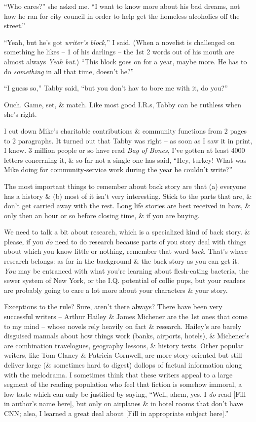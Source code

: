 \documentclass{article}
\numberwithin{equation}{section}
\begin{document}
``Who cares?'' she asked me. ``I want to know more about his bad dreams, not how he ran for city council in order to help get the homeless alcoholics off the street.''

``Yeah, but he's got \textit{writer's block},'' I said. (When a novelist is challenged on something he likes -- 1 of his darlings -- the 1st 2 words out of his mouth are almost always \textit{Yeah but}.) ``This block goes on for a year, maybe more. He has to do \textit{something} in all that time, doesn't he?''

``I guess so,'' Tabby said, ``but you don't hav to bore me with it, do you?''

Ouch. Game, set, \& match. Like most good I.R.s, Tabby can be ruthless when she's right.

I cut down Mike's charitable contributions \& community functions from 2 pages to 2 paragraphs. It turned out that Tabby was right -- as soon as I saw it in print, I knew. 3 million people or so have read \textit{Bag of Bones}, I've gotten at least 4000 letters concerning it, \& so far not a single one has said, ``Hey, turkey! What was Mike doing for community-service work during the year he couldn't write?''

The most important things to remember about back story are that (a) everyone has a history \& (b) most of it isn't very interesting. Stick to the parts that are, \& don't get carried away with the rest. Long life stories are best received in bars, \& only then an hour or so before closing time, \& if you are buying.

 We need to talk a bit about research, which is a specialized kind of back story. \& please, if you \textit{do} need to do research because parts of you story deal with things about which you know little or nothing, remember that word \textit{back}. That's where research belongs: as far in the background \& the back story as you can get it. \textit{You} may be entranced with what you're learning about flesh-eating bacteria, the sewer system of New York, or the I.Q. potential of collie pups, but your readers are probably going to care a lot more about your characters \& your story.

Exceptions to the rule? Sure, aren't there always? There have been very successful writers -- Arthur Hailey \& James Michener are the 1st ones that come to my mind -- whose novels rely heavily on fact \& research. Hailey's are barely disguised manuals about how things work (banks, airports, hotels), \& Michener's are combination travelogues, geography lessons, \& history texts. Other popular writers, like Tom Clancy \& Patricia Cornwell, are more story-oriented but still deliver large (\& sometimes hard to digest) dollops of factual information along with the melodrama. I sometimes think that these writers appeal to a large segment of the reading population who feel that fiction is somehow immoral, a low taste which can only be justified by saying, ``Well, ahem, yes, I \textit{do} read [Fill in author's name here], but only on airplanes \& in hotel rooms that don't have CNN; also, I learned a great deal about [Fill in appropriate subject here].''
\end{document}
